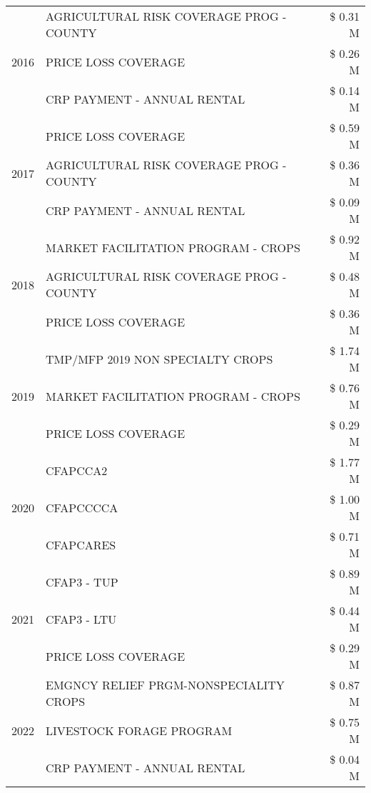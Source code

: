 \begin{tabular}{llr}
\cline{1-3}
\multirow[t]{3}{*}{2016} & AGRICULTURAL RISK COVERAGE PROG - COUNTY & \$ 0.31 M \\
 & PRICE LOSS COVERAGE & \$ 0.26 M \\
 & CRP PAYMENT - ANNUAL RENTAL & \$ 0.14 M \\
\cline{1-3}
\multirow[t]{3}{*}{2017} & PRICE LOSS COVERAGE & \$ 0.59 M \\
 & AGRICULTURAL RISK COVERAGE PROG - COUNTY & \$ 0.36 M \\
 & CRP PAYMENT - ANNUAL RENTAL & \$ 0.09 M \\
\cline{1-3}
\multirow[t]{3}{*}{2018} & MARKET FACILITATION PROGRAM - CROPS & \$ 0.92 M \\
 & AGRICULTURAL RISK COVERAGE PROG - COUNTY & \$ 0.48 M \\
 & PRICE LOSS COVERAGE & \$ 0.36 M \\
\cline{1-3}
\multirow[t]{3}{*}{2019} & TMP/MFP 2019 NON SPECIALTY CROPS & \$ 1.74 M \\
 & MARKET FACILITATION PROGRAM - CROPS & \$ 0.76 M \\
 & PRICE LOSS COVERAGE & \$ 0.29 M \\
\cline{1-3}
\multirow[t]{3}{*}{2020} & CFAPCCA2 & \$ 1.77 M \\
 & CFAPCCCCA & \$ 1.00 M \\
 & CFAPCARES & \$ 0.71 M \\
\cline{1-3}
\multirow[t]{3}{*}{2021} & CFAP3 - TUP & \$ 0.89 M \\
 & CFAP3 - LTU & \$ 0.44 M \\
 & PRICE LOSS COVERAGE & \$ 0.29 M \\
\cline{1-3}
\multirow[t]{3}{*}{2022} & EMGNCY RELIEF PRGM-NONSPECIALITY CROPS & \$ 0.87 M \\
 & LIVESTOCK FORAGE PROGRAM & \$ 0.75 M \\
 & CRP PAYMENT - ANNUAL RENTAL & \$ 0.04 M \\
\cline{1-3}
\bottomrule
\end{tabular}
